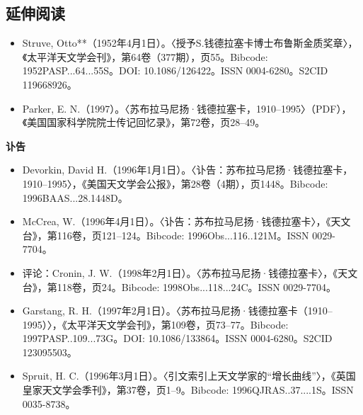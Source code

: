 \subsection{延伸阅读}
\begin{itemize}
\item Struve, Otto**（1952年4月1日）。〈授予S.钱德拉塞卡博士布鲁斯金质奖章〉，《太平洋天文学会刊》，第64卷（377期），页55。Bibcode: 1952PASP...64...55S。DOI: 10.1086/126422。ISSN 0004-6280。S2CID 119668926。
\item Parker, E. N.（1997）。〈苏布拉马尼扬·钱德拉塞卡，1910–1995〉（PDF），《美国国家科学院院士传记回忆录》，第72卷，页28–49。
\end{itemize}
\textbf{讣告}
\begin{itemize}
\item Devorkin, David H.（1996年1月1日）。〈讣告：苏布拉马尼扬·钱德拉塞卡，1910–1995〉，《美国天文学会公报》，第28卷（4期），页1448。Bibcode: 1996BAAS...28.1448D。
\item McCrea, W.（1996年4月1日）。〈讣告：苏布拉马尼扬·钱德拉塞卡〉，《天文台》，第116卷，页121–124。Bibcode: 1996Obs...116..121M。ISSN 0029-7704。
\item 评论：Cronin, J. W.（1998年2月1日）。〈苏布拉马尼扬·钱德拉塞卡〉，《天文台》，第118卷，页24。Bibcode: 1998Obs...118...24C。ISSN 0029-7704。
\item Garstang, R. H.（1997年2月1日）。〈苏布拉马尼扬·钱德拉塞卡（1910–1995）〉，《太平洋天文学会刊》，第109卷，页73–77。Bibcode: 1997PASP..109...73G。DOI: 10.1086/133864。ISSN 0004-6280。S2CID 123095503。
\item Spruit, H. C.（1996年3月1日）。〈引文索引上天文学家的“增长曲线”〉，《英国皇家天文学会季刊》，第37卷，页1–9。Bibcode: 1996QJRAS..37....1S。ISSN 0035-8738。
\end{itemize}
